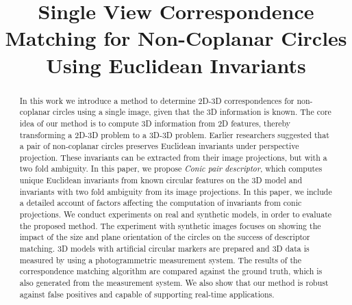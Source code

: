 \documentclass{bmvc2k}
\title{Single View Correspondence Matching for Non-Coplanar Circles Using Euclidean Invariants}
\newcommand{\yuji}[1]{\textcolor{magenta}{[Yuji: #1]}}
\begin{document}
\maketitle

\begin{abstract}
In this work we introduce a method to determine 2D-3D correspondences for non-coplanar circles using a single image, given that the 3D information is known. 
The core idea of our method is to compute 3D information from 2D features, thereby transforming a 2D-3D problem to a 3D-3D problem. 
Earlier researchers suggested that a pair of non-coplanar circles preserves Euclidean invariants under perspective projection.
These invariants can be extracted from their image projections, but with a two fold ambiguity. 
In this paper, we propose \textit{Conic pair descriptor}, which computes unique Euclidean invariants from known circular features on the 3D model and invariants with two fold ambiguity from its image projections.
In this paper, we include a detailed account of factors affecting the computation of invariants from conic projections. 
We conduct experiments on real and synthetic models, in order to evaluate the proposed method. 
The experiment with synthetic images focuses on showing the impact of the size and plane orientation of the circles on the success of descriptor matching. 
3D models with artificial circular markers are prepared and 3D data is measured by using a photogrammetric measurement system. 
The results of the correspondence matching algorithm are compared against the ground truth, which is also generated from the measurement system. 
We also show that our method is robust against false positives and capable of supporting real-time applications.   

\end{abstract}

\end{document}
